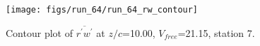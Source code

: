 \begin{figure}[H]
\centering
\texttt{[image: figs/run\_64/run\_64\_rw\_contour]}
\caption{Contour plot of $\overline{r^\prime w^\prime}$ at $z/c$=10.00, $V_{free}$=21.15, station 7.}
\end{figure}


